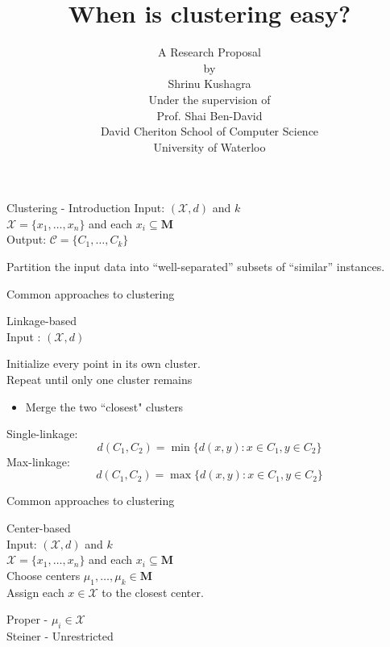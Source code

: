 \documentclass{beamer}
\title[Easy clustering]{When is clustering easy? }
\author[Kushagra, Shrinu]{
A Research Proposal\\
by\\
Shrinu Kushagra\\
\vspace{20pt}Under the supervision of\\
Prof. Shai Ben-David\vspace{20pt}\\
David Cheriton School of Computer Science\\
University of Waterloo
}
\newcommand{\mc}{\mathcal}
\newcommand{\mb}{\mathbf}
\begin{document}
\begin{frame}
  \titlepage
\end{frame}

\begin{frame}{Clustering - Introduction}
	Input: $(\mc X, d)$ and $k$\\
	$\mc X  =\{x_1, \ldots, x_n\}$ and each $ x_i \subseteq \mb M$\\   
	\vspace{1cm}Output: $\mc C = \{C_1, \ldots, C_k\}$\\
	

	\vspace{2cm}

	Partition the input data into \alert{``well-separated''} subsets of \alert{``similar''} instances.
\end{frame}

\begin{frame}{Common approaches to clustering}

	{\color{blue}Linkage-based} \\
	
	\vspace{0.5cm}Input : $(\mc X, d)$
	\vspace{0.2cm}	\begin{block}{}
		Initialize every point in its own cluster.\\
		\vspace{0.41cm}Repeat until only one cluster remains
		\begin{itemize}
			\item Merge the two ``closest" clusters
		\end{itemize}
	\end{block}
	
	\pause
	\vspace{0.5cm}Single-linkage: $$d(C_1, C_2) = \min\{d(x, y): x \in C_1, y \in C_2\}$$
	\vspace{0.5cm}Max-linkage: $$d(C_1, C_2) = \max\{d(x, y): x \in C_1, y \in C_2\}$$
	
\end{frame}

\begin{frame}{Common approaches to clustering}

	{\color{blue}Center-based} \\
	\vspace{0.4cm}Input: $(\mc X, d)$ and $k$\\
	$\mc X  =\{x_1, \ldots, x_n\}$ and each $ x_i \subseteq \mb M$\\   
	
	\vspace{1cm}\alert{Choose} centers $\mu_1, \ldots, \mu_k \in \mb M$\\
	\vspace{0.4cm}	Assign each $x \in \mc X$ to the closest center.
	
	\vspace{1cm}Proper - $\mu_i \in \mc X$\\
	\vspace{0.5cm}Steiner - Unrestricted\\
	
\end{frame}
\end{document}
